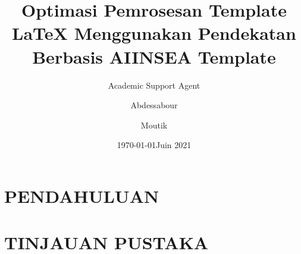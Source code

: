 \documentclass{insea}
\title{Optimasi Pemrosesan Template LaTeX Menggunakan Pendekatan Berbasis AI}
\author{Academic Support Agent}
\date{\today}
\begin{document}
\maketitle

\begin{abstract}

\end{abstract}

\chapter{PENDAHULUAN}


\chapter{TINJAUAN PUSTAKA}




\date{Juin 2021}
\title{INSEA Template}
\author{Abdessabour \and Moutik}

\graphicspath{{Images/}{../Images/}}
\end{document}
